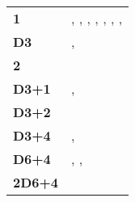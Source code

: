 



\centeredsubtitle{\reanimated}

{\normalfontsize\renewcommand{\arraystretch}{1.5}%
\begin{center}\begin{tabular}{M{0.9cm}m{11cm}}%
\toprule%
\textbf{1} & \characters{}, \courtofthedamned{}, \altarofundeath{}, \darkcoach{}, \modelsofthesuffering{}, \shriekinghorror{}, \vampireknights{}, \varkolak{}\tabularnewline
\textbf{D3} & \wingedreapers{}, \vampirespawn{}\tabularnewline
\textbf{2} & \cadaverwagon{}\tabularnewline
\textbf{D3+1} & \ghasts{}, \greatbats{}\tabularnewline
\textbf{D3+2} & \barrowknights{}\tabularnewline
\textbf{D3+4} & \direwolves{}, \barrowguard{}\tabularnewline
\textbf{D6+4} & \skeletons{}, \ghouls{}, \batswarm{}\tabularnewline
\textbf{2D6+4} & \zombies{}\tabularnewline
\bottomrule
\end{tabular}\end{center}
}

\vspace*{1cm}
\begin{center}
	 \spacebetweenlogos{}%
	 \spacebetweenlogos{}%
	 \spacebetweenlogos{}%
	\spacebetweenlogos{} %
\end{center}

\debugfooter
